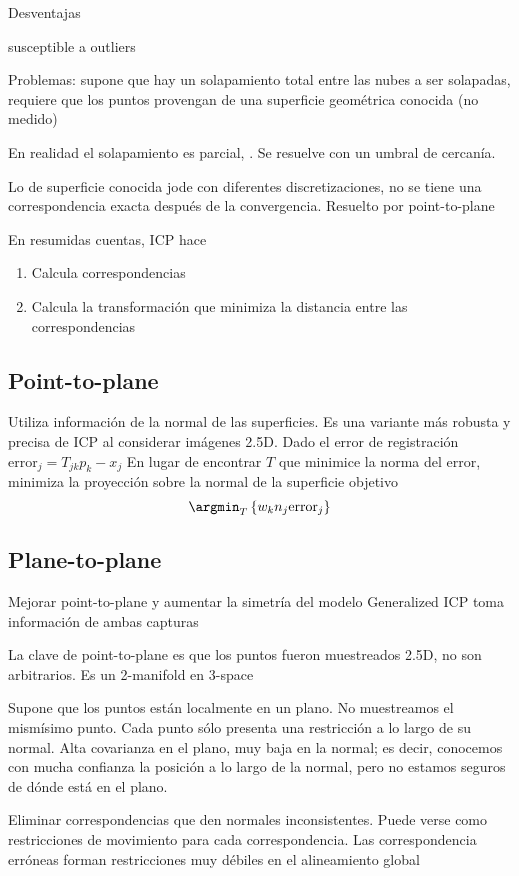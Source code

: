 Desventajas

susceptible a outliers 



Problemas:
	supone que hay un solapamiento total entre las nubes a ser solapadas,
	requiere que los puntos provengan de una superficie geométrica conocida (no medido)

En realidad el solapamiento es parcial, .
Se resuelve con un umbral de cercanía.

Lo de superficie conocida jode con diferentes discretizaciones,
no se tiene una correspondencia exacta después de la convergencia. Resuelto por point-to-plane


En resumidas cuentas, ICP hace
\begin{enumerate}
	\item Calcula correspondencias
	\item Calcula la transformación que minimiza la distancia entre las correspondencias
\end{enumerate}

\subsection{Point-to-plane}
Utiliza información de la normal de las superficies.
Es una variante más robusta y precisa de ICP al considerar imágenes 2.5D.
Dado el error de registración $ \mbox{error}_j = T_{jk} p_k - x_j$
En lugar de encontrar $T$ que minimice la norma del error, minimiza la proyección sobre la normal de la superficie objetivo
\[ \argmin_T \left\{ w_k n_j \mbox{error}_j \right\} \]

\subsection{Plane-to-plane}
Mejorar point-to-plane y aumentar la simetría del modelo 
Generalized ICP toma información de ambas capturas

La clave de point-to-plane es que los puntos fueron muestreados 2.5D, no son arbitrarios.
Es un 2-manifold en 3-space  

Supone que los puntos están localmente en un plano. No muestreamos el mismísimo punto.
Cada punto sólo presenta una restricción a lo largo de su normal.
Alta covarianza en el plano, muy baja en la normal; es decir, conocemos con mucha confianza
la posición a lo largo de la normal, pero no estamos seguros de dónde está en el plano.

Eliminar correspondencias que den normales inconsistentes.
Puede verse como restricciones de movimiento para cada correspondencia.
Las correspondencia erróneas forman restricciones muy débiles en el alineamiento global 


